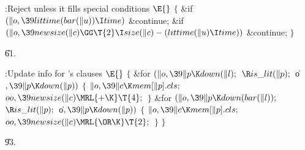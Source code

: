\B{}:Reject  unless it fills special conditions%
\X${}\E{}$\6
${}\{{}$\1\6
\&{if} ${}(\|o,\39\\{littime}(\\{bar}(\|u))\I\\{time}){}$\1\5
\&{continue};\2\6
\&{if} ${}(\|o,\39\\{newsize}(\|c)\GG\T{2}\I\\{size}(\|c)-(\\{littime}(\|u)\I%
\\{time})){}$\1\5
\&{continue};\2\6
\4${}\}{}$\2\par
\U61.\fi

\B{}:Update  info for 's clauses%
\X${}\E{}$\6
${}\{{}$\1\6
\&{for} ${}(\|o,\39\|p\K\\{down}(\|l);{}$ ${}\R\\{is\_lit}(\|p);{}$ \|o${},\39%
\|p\K\\{down}(\|p)){}$\5
${}\{{}$\1\6
${}\|o,\39\|c\K\\{mem}[\|p].\\{cls};{}$\6
${}\\{oo},\39\\{newsize}(\|c)\MRL{+{\K}}\T{4};{}$\6
\4${}\}{}$\2\6
\&{for} ${}(\|o,\39\|p\K\\{down}(\\{bar}(\|l));{}$ ${}\R\\{is\_lit}(\|p);{}$ %
\|o${},\39\|p\K\\{down}(\|p)){}$\5
${}\{{}$\1\6
${}\|o,\39\|c\K\\{mem}[\|p].\\{cls};{}$\6
${}\\{oo},\39\\{newsize}(\|c)\MRL{{\OR}{\K}}\T{2};{}$\6
\4${}\}{}$\2\6
\4${}\}{}$\2\par
\U93.\fi

